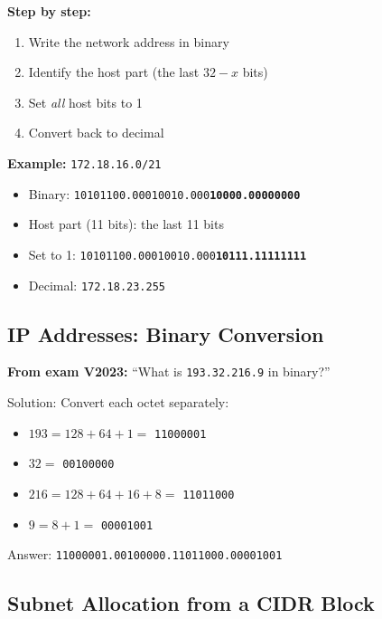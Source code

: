 \begin{warnbox}
\textbf{Step by step:}
\begin{enumerate}[noitemsep]
    \item Write the network address in binary
    \item Identify the host part (the last $32 - x$ bits)
    \item Set \emph{all} host bits to 1
    \item Convert back to decimal
\end{enumerate}

\textbf{Example:} \texttt{172.18.16.0/21}
\begin{itemize}[noitemsep]
    \item Binary: \texttt{10101100.00010010.000\textbf{10000.00000000}}
    \item Host part (11 bits): the last 11 bits
    \item Set to 1: \texttt{10101100.00010010.000\textbf{10111.11111111}}
    \item Decimal: \texttt{172.18.23.255}
\end{itemize}
\end{warnbox}

\subsection{IP Addresses: Binary Conversion}

\begin{exambox}
\textbf{From exam V2023:} ``What is \texttt{193.32.216.9} in binary?''

Solution: Convert each octet separately:
\begin{itemize}[noitemsep]
    \item $193 = 128 + 64 + 1 = $ \texttt{11000001}
    \item $32 = $ \texttt{00100000}
    \item $216 = 128 + 64 + 16 + 8 = $ \texttt{11011000}
    \item $9 = 8 + 1 = $ \texttt{00001001}
\end{itemize}
Answer: \texttt{11000001.00100000.11011000.00001001}
\end{exambox}

\subsection{Subnet Allocation from a CIDR Block}

